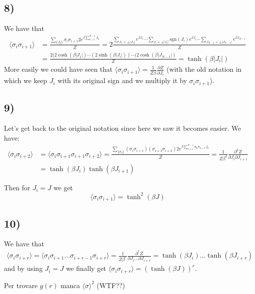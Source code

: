 \documentclass[10pt,a4paper]{book}
\newcommand{\p}{\partial}
\begin{document}
\subsection*{8)}
We have that
\begin{align*}
\langle \sigma_i\sigma_{i+1}\rangle &=\frac{\sum_{\{J_k\}}\sigma_i\sigma_{i+1}2e^{\beta\sum_{k=1}^{N-1}J_k}}{Z}=2\frac{\sum_{J_1=\pm|J_1|}e^{\beta J_1}\cdots \sum_{J_i=\pm|J_i|}\text{sgn}(J_i)e^{\beta J_i}\cdots \sum_{J_{N-1}=\pm|J_{N-1}|}e^{\beta J_{N-1}}}{Z}\\
&=\frac{2(2\cosh(\beta |J_1|)\cdots (2\sinh(\beta |J_i|))\cdots (2\cosh(\beta |J_{N-1}|)}{Z}=\tanh(\beta |J_i|)
\end{align*}
More easily we could have seen that $\langle \sigma_i\sigma_{i+1}\rangle =\frac{1}{Z\beta}\frac{\p Z}{\p J_i}$ (with the old notation in which we keep $J_i$ with its original sign and we multiply it by $\sigma_i\sigma_{i+1}$).

\subsection*{9)}
Let's get back to the original notation since here we saw it becomes easier. We have:
\begin{align*}
\langle \sigma_i\sigma_{i+2}\rangle&=\langle \sigma_i\sigma_{i+1}\sigma_{i+1}\sigma_{i+2}\rangle =\frac{\sum_{\{\sigma_i\}}(\sigma_i\sigma_{i+1})(\sigma_{i+1}\sigma_{i+2})2e^{\beta\sum_{k=1}^{N-1}\sigma_k\sigma_{k+1}J_k}}{Z}=\frac{1}{Z\beta^2}\frac{\p^2 Z}{\p J_i\p J_{i+1}}\\
&=\tanh(\beta J_i)\tanh(\beta J_{i+1})
\end{align*}

Then for $J_i=J$ we get 
$$\langle \sigma_i\sigma_{i+1}\rangle =\tanh^2(\beta J)$$


\subsection*{10)}

We have that
\begin{align*}
\langle\sigma_i\sigma_{i+r}\rangle=\langle\sigma_i\sigma_{i+1}\ldots\sigma_{i+r-1}\sigma_{i+r}\rangle=\frac{1}{Z\beta^r}\frac{\p ^r Z}{\p J_i\ldots \p J_{i+r}}=\tanh(\beta J_i)\ldots\tanh(\beta J_{i+r})
\end{align*}
and by using $J_i=J$ we finally get
$\langle \sigma_i\sigma_{i+r}\rangle =(\tanh(\beta J))^r$. 

Per trovare $g(r)$ manca $\langle \sigma\rangle^2$ (WTF??)
\end{document}
